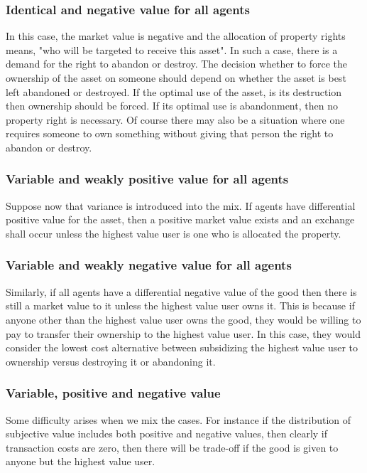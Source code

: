 \subsubsection{Identical and negative value for all agents}

In this case, the market value is negative and the allocation of property rights means,  "who will be targeted to receive this asset". In such a case, there is a demand for the right to abandon or destroy. The decision whether to force the ownership of the asset on someone should depend on whether the asset is best left abandoned or destroyed. If the optimal use of the asset, is its destruction then ownership should be forced. If its optimal use is abandonment, then no property right is necessary. Of course there may also be a situation where one requires someone to own something without giving that person the right to abandon or destroy.

\subsubsection{Variable and weakly positive value for all agents}

Suppose now that variance is introduced into the mix. If agents have differential positive value for the asset, then a positive market value exists and an exchange shall occur unless the highest value user is one who is allocated the property.

\subsubsection{Variable and weakly negative value for all agents}

Similarly, if all agents have a differential negative value of the good then there is still a market value to it unless the highest value user owns it. This is because if anyone other than the highest value user owns the good, they would be willing to pay to transfer their ownership to the highest value user. In this case, they would consider the lowest cost alternative between subsidizing the highest value user to ownership versus destroying it or abandoning it.

\subsubsection{Variable, positive and negative value}

Some difficulty arises when we mix the cases. For instance if the distribution of subjective value includes both positive and negative values, then clearly if transaction costs are zero, then there will be trade-off if the good is given to anyone but the highest value user.


